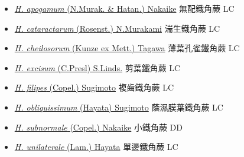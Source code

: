 \begin{itemize}
  \begin{itemize}
        \item[] \href{http://www.theplantlist.org/tpl1.1/search?q=Hymenasplenium+apogamum}{\textit{H. apogamum} (N.Murak. \& Hatan.) Nakaike}   無配鐵角蕨   LC
        \item[] \href{http://www.theplantlist.org/tpl1.1/search?q=Hymenasplenium+cataractarum}{\textit{H. cataractarum} (Rosenst.) N.Murakami}   湍生鐵角蕨   LC
        \item[] \href{http://www.theplantlist.org/tpl1.1/search?q=Hymenasplenium+cheilosorum}{\textit{H. cheilosorum} (Kunze ex Mett.) Tagawa}   薄葉孔雀鐵角蕨   LC
        \item[] \href{http://www.theplantlist.org/tpl1.1/search?q=Hymenasplenium+excisum}{\textit{H. excisum} (C.Presl) S.Linds.}   剪葉鐵角蕨   LC
        \item[] \href{http://www.theplantlist.org/tpl1.1/search?q=Hymenasplenium+filipes}{\textit{H. filipes} (Copel.) Sugimoto}   複齒鐵角蕨   LC
        \item[] \href{http://www.theplantlist.org/tpl1.1/search?q=Hymenasplenium+obliquissimum}{\textit{H. obliquissimum} (Hayata) Sugimoto}   蔭濕膜葉鐵角蕨   LC
        \item[] \href{http://www.theplantlist.org/tpl1.1/search?q=Hymenasplenium+subnormale}{\textit{H. subnormale} (Copel.) Nakaike}   小鐵角蕨   DD
        \item[] \href{http://www.theplantlist.org/tpl1.1/search?q=Hymenasplenium+unilaterale}{\textit{H. unilaterale} (Lam.) Hayata}   單邊鐵角蕨   LC
  \end{itemize}
  \end{itemize}
